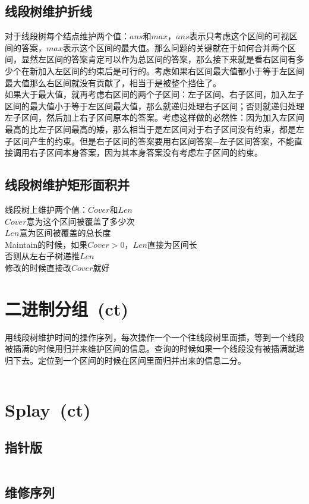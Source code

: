 	\subsection*{线段树维护折线}
		对于线段树每个结点维护两个值：$ ans $和$ max $，$ ans $表示只考虑这个区间的可视区间的答案，$ max $表示这个区间的最大值。那么问题的关键就在于如何合并两个区间，显然左区间的答案肯定可以作为总区间的答案，那么接下来就是看右区间有多少个在新加入左区间的约束后是可行的。考虑如果右区间最大值都小于等于左区间最大值那么右区间就没有贡献了，相当于是被整个挡住了。
		\\如果大于最大值，就再考虑右区间的两个子区间：左子区间、右子区间，加入左子区间的最大值小于等于左区间最大值，那么就递归处理右子区间；否则就递归处理左子区间，然后加上右子区间原本的答案。考虑这样做的必然性：因为加入左区间最高的比左子区间最高的矮，那么相当于是左区间对于右子区间没有约束，都是左子区间产生的约束。但是右子区间的答案要用右区间答案$ - $左子区间答案，不能直接调用右子区间本身答案，因为其本身答案没有考虑左子区间的约束。
	\subsection*{线段树维护矩形面积并}
		线段树上维护两个值：$ Cover $和$ Len $
		\\$ Cover $意为这个区间被覆盖了多少次
		\\$ Len $意为区间被覆盖的总长度
		\\Maintain的时候，如果$ Cover > 0 $，$ Len $直接为区间长
		\\否则从左右子树递推$ Len $
		\\修改的时候直接改$ Cover $就好
\section{二进制分组\ \small(ct)}
	用线段树维护时间的操作序列，每次操作一个一个往线段树里面插，等到一个线段被插满的时候用归并来维护区间的信息。查询的时候如果一个线段没有被插满就递归下去。定位到一个区间的时候在区间里面归并出来的信息二分。
	\inputminted{cpp}{data_structure/binary_group.cpp}
\section{Splay\ \small(ct)}
	\subsection*{指针版}
		\inputminted{cpp}{data_structure/splay.cpp}
	\subsection*{维修序列}
		\inputminted{cpp}{data_structure/splay_arr.cpp}
